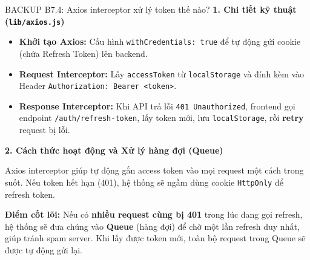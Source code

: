 \documentclass[10pt, aspectratio=169]{beamer}
\begin{document}
\begin{frame}[fragile, label=b7_4]{BACKUP B7.4: Axios interceptor xử lý token thế nào?}
\hypertarget{b7_4_target}{}
    \textbf{1. Chi tiết kỹ thuật (\texttt{lib/axios.js})}
    \vspace{0.1cm}
    
    \begin{itemize}
        \item \textbf{Khởi tạo Axios:} Cấu hình \texttt{withCredentials: true} để tự động gửi cookie (chứa Refresh Token) lên backend.
        \item \textbf{Request Interceptor:} Lấy \texttt{accessToken} từ \texttt{localStorage} và đính kèm vào Header \texttt{Authorization: Bearer <token>}.
        \item \textbf{Response Interceptor:} Khi API trả lỗi \texttt{401 Unauthorized}, frontend gọi endpoint \texttt{/auth/refresh-token}, lấy token mới, lưu \texttt{localStorage}, rồi \textbf{retry} request bị lỗi.
    \end{itemize}

    \vspace{0.2cm}
    \textbf{2. Cách thức hoạt động và Xử lý hàng đợi (Queue)}
    \vspace{0.1cm}
    
    Axios interceptor giúp tự động gắn access token vào mọi request một cách trong suốt. Nếu token hết hạn (401), hệ thống sẽ ngầm dùng cookie \texttt{HttpOnly} để refresh token.
    
    \textbf{Điểm cốt lõi:} Nếu có \textbf{nhiều request cùng bị 401} trong lúc đang gọi refresh, hệ thống sẽ đưa chúng vào \textbf{Queue} (hàng đợi) để chờ một lần refresh duy nhất, giúp tránh spam server. Khi lấy được token mới, toàn bộ request trong Queue sẽ được tự động gửi lại.
\end{frame}
\end{document}

